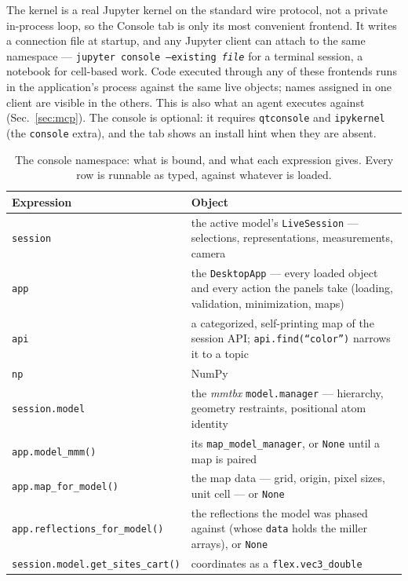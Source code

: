 \documentclass[11pt]{article}
\begin{document}
The kernel is a real Jupyter kernel on the standard wire protocol, not a
private in-process loop, so the Console tab is only its most convenient
frontend. It writes a connection file at startup, and any Jupyter client
can attach to the same namespace --- \texttt{jupyter console --existing
\emph{file}} for a terminal session, a notebook for cell-based work. Code
executed through any of these frontends runs in the application's process
against the same live objects; names assigned in one client are visible in
the others. This is also what an agent executes against
(Sec.~\ref{sec:mcp}). The console is optional: it requires
\texttt{qtconsole} and \texttt{ipykernel} (the \texttt{console} extra), and
the tab shows an install hint when they are absent.

\begin{table}[H]
\centering
\caption{The console namespace: what is bound, and what each expression
gives. Every row is runnable as typed, against whatever is loaded.}
\label{tab:console}
\begin{tabular}{@{}lp{9.6cm}@{}}
\toprule
Expression & Object \\
\midrule
\texttt{session} & the active model's \texttt{LiveSession} --- selections,
representations, measurements, camera \\
\texttt{app} & the \texttt{DesktopApp} --- every loaded object and every
action the panels take (loading, validation, minimization, maps) \\
\texttt{api} & a categorized, self-printing map of the session API;
\texttt{api.find(``color'')} narrows it to a topic \\
\texttt{np} & NumPy \\
\midrule
\texttt{session.model} & the \emph{mmtbx} \texttt{model.manager} ---
hierarchy, geometry restraints, positional atom identity \\
\texttt{app.model\_mmm()} & its \texttt{map\_model\_manager}, or
\texttt{None} until a map is paired \\
\texttt{app.map\_for\_model()} & the map data --- grid, origin, pixel
sizes, unit cell --- or \texttt{None} \\
\texttt{app.reflections\_for\_model()} & the reflections the model was
phased against (whose \texttt{data} holds the miller arrays), or
\texttt{None} \\
\texttt{session.model.get\_sites\_cart()} & coordinates as a
\texttt{flex.vec3\_double} \\
\bottomrule
\end{tabular}
\end{table}
\end{document}
